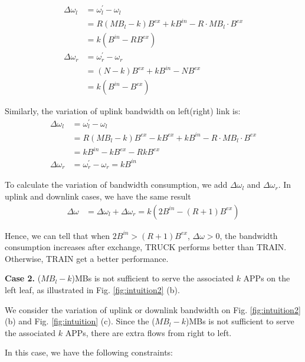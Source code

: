 \documentclass[10pt, conference, letterpaper]{IEEEtran}
\begin{document}
\begin{equation}
\begin{aligned}
\Delta \omega_l &= \omega_l^{'} - \omega_l\\
&=R(MB_l-k)B^{ex}+kB^{in}-R\cdot MB_l\cdot B^{ex} \\
&= k(B^{in}-RB^{ex}) \\
\Delta \omega_r &= \omega_r^{'} - \omega_r \\
&=(N-k)B^{ex}+kB^{in}-NB^{ex} \\
&=k(B^{in}-B^{ex})
\end{aligned}
\end{equation}

Similarly, the variation of uplink bandwidth on left(right) link is:
\begin{equation}
\begin{aligned}
\Delta \omega_l &= \omega_l^{'} - \omega_l\\
&=R(MB_l-k)B^{ex}-kB^{ex}+kB^{in}-R\cdot MB_l\cdot B^{ex} \\
&= kB^{in}-kB^{ex}-RkB^{ex} \\
\Delta \omega_r &= \omega_r^{'} - \omega_r = kB^{in}
\end{aligned}
\end{equation}

To calculate the variation of bandwidth consumption, we add $\Delta \omega_l$ and $\Delta \omega_r$. In uplink and downlink cases, we have the same result
\begin{equation}
\begin{aligned}
\Delta \omega &=\Delta \omega_l +\Delta \omega_r = k(2B^{in}-(R+1)B^{ex})
\end{aligned}
\end{equation}

Hence, we can tell that when $2B^{in} > (R+1)B^{ex}$, $\Delta \omega > 0$, the bandwidth consumption increases after exchange, TRUCK performs better than TRAIN. Otherwise, TRAIN get a better performance.

\textbf{Case 2. } ($MB_l-k$)MBs is not sufficient to serve the associated $k$ APPs on the left leaf, as illustrated in Fig. \ref{fig:intuition2} (b). 

We consider the variation of uplink or downlink bandwidth on Fig. \ref{fig:intuition2} (b) and Fig. \ref{fig:intuition} (c). Since the ($MB_l-k$)MBs is not sufficient to serve the associated $k$ APPs, there are extra flows from right to left.

In this case, we have the following constraints:
\end{document}
